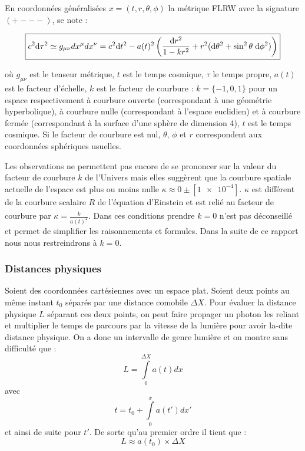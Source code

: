 \documentclass[10pt, a4paper]{report}
\numberwithin{equation}{subsection}
\begin{document}
En coordonnées généralisées $x= (t,r, \theta, \phi)$ la métrique FLRW avec la signature $(+---)$, se note :

\begin{equation}
\boxed{ c^2 {\rm d}\tau^2 \simeq g_{\mu \nu}dx^{\mu}dx^{\nu} = c^2 {\rm d}t^2 - a(t)^2 \left (\frac{{\rm d}r^2}{1 - k r^2} + r^2 ({\rm d}\theta^2 + \sin^2 \theta \; {\rm d} \phi^2) \right )}
\end{equation}

où $g_{\mu \nu}$ est le tenseur métrique, $t$ est le temps cosmique, $\tau$ le temps propre, $a(t)$ est le facteur d'échelle, $k$ est le facteur de courbure : $k = \{-1,0,1\}$ pour un espace respectivement à courbure ouverte (correspondant à une géométrie hyperbolique), à courbure nulle (correspondant à l'espace euclidien) et à courbure fermée (correspondant à la surface d'une sphère de dimension 4), $t$ est le temps cosmique. Si le facteur de courbure est nul, $\theta$, $\phi$ et $r$ correspondent aux coordonnées sphériques usuelles.

Les observations ne permettent pas encore de se prononcer sur la valeur du facteur de courbure $k$ de l'Univers mais elles suggèrent que la courbure spatiale actuelle de l'espace est plus ou moins nulle $ \kappa \approx 0 \pm [\num{1e-4}]$. $\kappa$ est différent de la courbure scalaire $R$ de l'équation d'Einstein et est relié au facteur de courbure par $\kappa = \frac{k}{a(t)^2}$. Dans ces conditions prendre $k=0$ n'est pas déconseillé\textsuperscript{\cite{Weinberg}} et permet de simplifier les raisonnements et formules. Dans la suite de ce rapport nous nous restreindrons à $k=0$. 
\subsubsection{Distances physiques}
Soient des coordonnées cartésiennes avec un espace plat. Soient deux points au même instant $t_0$ séparés par une distance comobile $\Delta X$. Pour évaluer la distance physique $L$ séparant ces deux points, on peut faire propager un photon les reliant et multiplier le temps de parcours par la vitesse de la lumière pour avoir la-dite distance physique. On a donc un intervalle de genre lumière et on montre sans difficulté que :
\begin{equation}
\boxed{ L=\int\limits_0^{\Delta X} a(t)dx}
\end{equation}
avec \begin{equation}
\boxed{ t=t_0 + \int\limits_0^x a(t')dx'}
\end{equation}
et ainsi de suite pour $t'$.
De sorte qu'au premier ordre il tient que :
\begin{equation} \label{eq:foL}
\boxed{ L \approx a(t_0) \times \Delta X}
\end{equation}
\end{document}
